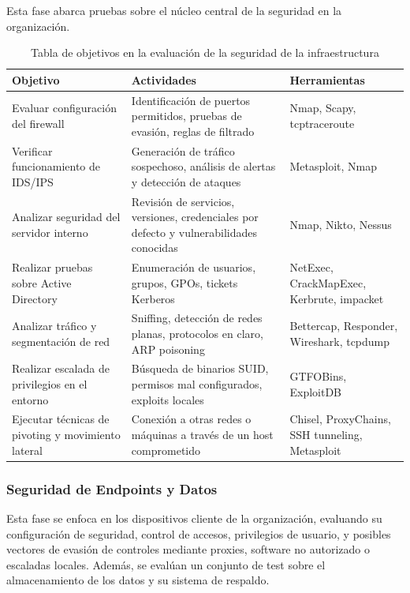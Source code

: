 \documentclass[a4paper, 11pt]{article}
\begin{document}
Esta fase abarca pruebas sobre el núcleo central de la seguridad en la organización.

\begin{table}[H]
\centering
\renewcommand{\arraystretch}{1.4}
\begin{tabular}{|p{4.3cm}|p{6.1cm}|p{4.5cm}|}
\hline
\textbf{Objetivo} & \textbf{Actividades} & \textbf{Herramientas} \\
\hline
Evaluar configuración del firewall & Identificación de puertos permitidos, pruebas de evasión, reglas de filtrado & Nmap, Scapy, tcptraceroute \\
\hline
Verificar funcionamiento de IDS/IPS & Generación de tráfico sospechoso, análisis de alertas y detección de ataques & Metasploit, Nmap \\
\hline
Analizar seguridad del servidor interno & Revisión de servicios, versiones, credenciales por defecto y vulnerabilidades conocidas & Nmap, Nikto, Nessus \\
\hline
Realizar pruebas sobre Active Directory & Enumeración de usuarios, grupos, GPOs, tickets Kerberos & NetExec, CrackMapExec, Kerbrute, impacket \\
\hline
Analizar tráfico y segmentación de red & Sniffing, detección de redes planas, protocolos en claro, ARP poisoning & Bettercap, Responder, Wireshark, tcpdump \\
\hline
Realizar escalada de privilegios en el entorno & Búsqueda de binarios SUID, permisos mal configurados, exploits locales & GTFOBins, ExploitDB \\
\hline
Ejecutar técnicas de pivoting y movimiento lateral & Conexión a otras redes o máquinas a través de un host comprometido & Chisel, ProxyChains, SSH tunneling, Metasploit \\
\hline
\end{tabular}
\caption{Tabla de objetivos en la evaluación de la seguridad de la infraestructura}
\end{table}








\subsubsection{Seguridad de Endpoints y Datos}

Esta fase se enfoca en los dispositivos cliente de la organización, evaluando su configuración de seguridad, control de accesos, privilegios de usuario, y posibles vectores de evasión de controles mediante proxies, software no autorizado o escaladas locales.
Además, se evalúan un conjunto de test sobre el almacenamiento de los datos y su sistema de respaldo.
\end{document}
